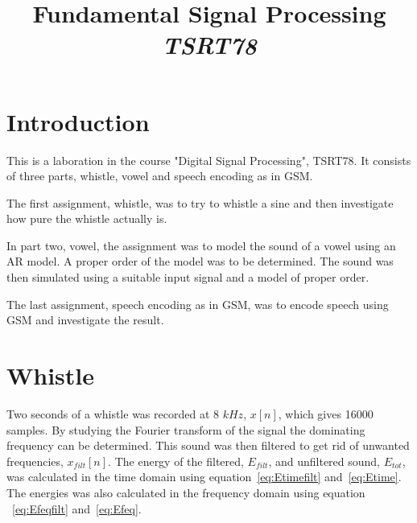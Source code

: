 \documentclass[10pt]{article}
\title{Fundamental Signal Processing\\
\emph{TSRT78}}
\begin{document}


\maketitle

\newpage
\tableofcontents
\newpage

\section{Introduction}
This is a laboration in the course "Digital Signal Processing", TSRT78.
It consists of three parts, whistle, vowel and speech encoding as in GSM.

The first assignment, whistle, was to try to whistle a sine and then
investigate how pure the whistle actually is.

In part two, vowel, the assignment was to model the sound of a vowel
using an AR model. A proper order of the model was to be determined.
The sound was then simulated using a suitable input signal and a
model of proper order.

The last assignment, speech encoding as in GSM, was to encode speech
using GSM and investigate the result.

\section{Whistle}
Two seconds of a whistle was recorded at 8 $kHz$, $x[n]$, which gives 16000 samples.
By studying the Fourier transform of the signal the dominating frequency can be
determined.
This sound was then filtered to get rid of unwanted frequencies, $x_{filt}[n]$.
The energy of the filtered, $E_{filt}$, and unfiltered sound, $E_{tot}$,
was calculated in the time domain using equation~\ref{eq:Etimefilt}
and~\ref{eq:Etime}. The energies was also calculated in the frequency
domain using equation ~\ref{eq:Efeqfilt} and~\ref{eq:Efeq}.
\end{document}
